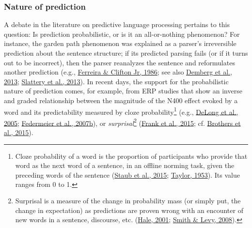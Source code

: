 \documentclass[a4paper, nobind]{templates/ociamthesis}
\begin{document}
\hypertarget{nature-of-prediction}{%
\subsubsection{Nature of prediction}\label{nature-of-prediction}}

\noindent
A debate in the literature on predictive language processing pertains to this question: Is prediction probabilistic, or is it an all-or-nothing phenomenon?
For instance, the garden path phenomenon was explained as a parser's irreversible prediction about the sentence structure;
if its predicted parsing fails (or if it turns out to be incorrect), then the parser reanalyzes the sentence and reformulates another prediction (e.g., \protect\hyperlink{ref-Ferreira1986}{Ferreira \& Clifton Jr, 1986}; see also \protect\hyperlink{ref-Demberg2013}{Demberg et al., 2013}; \protect\hyperlink{ref-Slattery2013}{Slattery et al., 2013}).
In recent days, the support for the probabilistic nature of prediction comes, for example, from ERP studies that show an inverse and graded relationship between the magnitude of the N400 effect evoked by a word and its predictability measured by cloze probability\footnote{Cloze probability of a word is the proportion of participants who provide that word as the next word of a sentence, in an offline norming task, given the preceding words of the sentence (\protect\hyperlink{ref-Staub2015a}{Staub et al., 2015}; \protect\hyperlink{ref-Taylor1953}{Taylor, 1953}). Its value ranges from 0 to 1.} (e.g., \protect\hyperlink{ref-Delong2005}{DeLong et al., 2005}; \protect\hyperlink{ref-Federmeier2007b}{Federmeier et al., 2007b}), or \emph{surprisal}\footnote{Surprisal is a measure of the change in probability mass (or simply put, the change in expectation) as predictions are proven wrong with an encounter of new words in a sentence, discourse, etc. (\protect\hyperlink{ref-Hale2001}{Hale, 2001}; \protect\hyperlink{ref-Smith2008}{Smith \& Levy, 2008}).} (\protect\hyperlink{ref-Frank2015}{Frank et al., 2015}; cf. \protect\hyperlink{ref-Brothers2015}{Brothers et al., 2015}).
\end{document}
